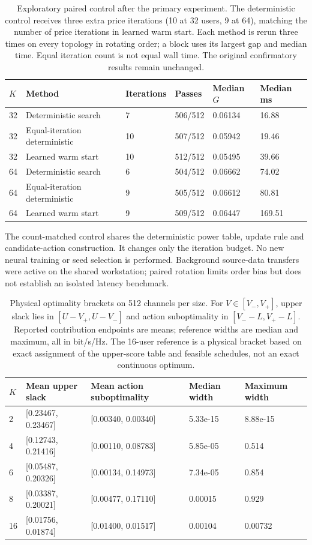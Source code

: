 \documentclass[10pt,letterpaper]{article}
\begin{document}
\begin{table}[htbp]\centering\small
\setlength{\tabcolsep}{4pt}
\caption{Exploratory paired control after the primary experiment. The deterministic control receives three extra price iterations (10 at 32 users, 9 at 64), matching the number of price iterations in learned warm start. Each method is rerun three times on every topology in rotating order; a block uses its largest gap and median time. Equal iteration count is not equal wall time. The original confirmatory results remain unchanged.}\label{supp:compute}
\begin{tabular}{llllll}\toprule
$K$ & Method & Iterations & Passes & Median $G$ & Median ms\\
\midrule
32 & Deterministic search & 7 & 506/512 & 0.06134 & 16.88\\
32 & Equal-iteration deterministic & 10 & 507/512 & 0.05942 & 19.46\\
32 & Learned warm start & 10 & 512/512 & 0.05495 & 39.66\\
64 & Deterministic search & 6 & 504/512 & 0.06662 & 74.02\\
64 & Equal-iteration deterministic & 9 & 505/512 & 0.06612 & 80.81\\
64 & Learned warm start & 9 & 509/512 & 0.06447 & 169.51\\
\bottomrule\end{tabular}
\end{table}
The count-matched control shares the deterministic power table, update rule and candidate-action construction. It changes only the iteration budget. No new neural training or seed selection is performed. Background source-data transfers were active on the shared workstation; paired rotation limits order bias but does not establish an isolated latency benchmark.

\begin{table}[htbp]\centering\small
\setlength{\tabcolsep}{4pt}
\caption{Physical optimality brackets on 512 channels per size. For $V\in[V_-,V_+]$, upper slack lies in $[U-V_+,U-V_-]$ and action suboptimality in $[V_--L,V_+-L]$. Reported contribution endpoints are means; reference widths are median and maximum, all in bit/s/Hz. The 16-user reference is a physical bracket based on exact assignment of the upper-score table and feasible schedules, not an exact continuous optimum.}\label{supp:decomposition}
\begin{tabular}{lllll}\toprule
$K$ & Mean upper slack & Mean action suboptimality & Median width & Maximum width\\
\midrule
2 & [0.23467, 0.23467] & [0.00340, 0.00340] & 5.33e-15 & 8.88e-15\\
4 & [0.12743, 0.21416] & [0.00110, 0.08783] & 5.85e-05 & 0.514\\
6 & [0.05487, 0.20326] & [0.00134, 0.14973] & 7.34e-05 & 0.854\\
8 & [0.03387, 0.20021] & [0.00477, 0.17110] & 0.00015 & 0.929\\
16 & [0.01756, 0.01874] & [0.01400, 0.01517] & 0.00104 & 0.00732\\
\bottomrule\end{tabular}
\end{table}
\end{document}
